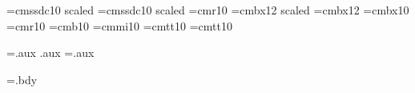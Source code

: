 



\def\forceodd{\ifodd\pageno\else\null\vfill\eject\fi}
\def\forceeven{\ifodd\pageno\null\vfill\eject\fi}

\def\ifundefined#1{\expandafter\ifx\csname#1\endcsname\relax}
\def\paramone#1#2{#1}
\def\firstparam#1{\expandafter\paramone #1}
\def\paramtwo#1#2{#2}
\def\secondparam#1{\expandafter\paramtwo #1}

\def\finalout{\overfullrule=0pt}

\def\raggedleft{\leftskip=0pt plus \hsize
\parfillskip=0pt\spaceskip=.3333em\xspaceskip=.5em}

\def\raggedboth{\leftskip=0pt plus 10in \rightskip=0pt plus 10in\parfillskip=0pt}

\font\titlefont=cmssdc10 scaled
\font\subtitlefont=cmssdc10 scaled
\font\textfont=cmr10
\font\chapterfont=cmbx12 scaled
\font\tocchapterfont=cmbx12
\font\sectionfont=cmbx10
\font\ssectionfont=cmr10
\font\bold=cmb10
\font\italic=cmmi10
\font\typewriter=cmtt10
\font\tw=cmtt10





\newread\aux
\immediate\openin\aux=\jobname.aux
\ifeof\aux {}
\else  \jobname.aux \immediate\closein\aux \fi
\newwrite\aux
\immediate\openout\aux=\jobname.aux

\newwrite\bdy
\immediate\openout\bdy=\jobname.bdy

